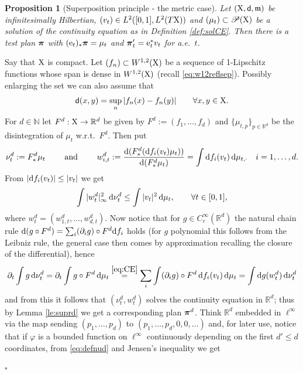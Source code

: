 \documentclass[11pt]{article}
\numberwithin{equation}{section}
\newtheorem{proposition}[theorem]{Proposition}
\newenvironment{idea}{\removelastskip\par\medskip   %
\noindent{\em Idea of the proof} \rm}{\penalty-20\null\hfill$\square$\par\medbreak}
\newcommand{\N}{\mathbb{N}}
\newcommand{\R}{\mathbb{R}}
\newcommand{\ppi}{{\mbox{\boldmath$\pi$}}}
\newcommand{\pr}{\mathscr P}
\newcommand{\e}{{\rm e}}
\newcommand{\X}{{\rm X}}
\newcommand{\sfd}{{\sf d}}
\newcommand{\mm}{{\mathfrak m}}
\renewcommand{\d}{{\rm d}}
\begin{document}
\begin{proposition}[Superposition principle  - the metric case]\label{prop:supmet}
Let $(\X,\sfd,\mm)$ be infinitesimally Hilbertian, $(v_t)\in L^2([0,1],L^2(T\X))$ and $(\mu_t)\subset  \pr(\X)$ be a solution of the continuity equation as in Definition \ref{def:solCE}. Then there is a test plan $\ppi$ with $(\e_t)_*\ppi=\mu_t$ and $\ppi'_t=\e_t^*v_t$ for a.e.\ $t$. 
\end{proposition}
\begin{idea} Say that $\X$ is compact. Let $(f_n)\subset W^{1,2}(\X)$ be a sequence of 1-Lipschitz  functions whose span is dense in $W^{1,2}(\X)$ (recall \eqref{eq:w12reflsep}). Possibly enlarging the set we can also assume that 
\begin{equation}
\label{eq:isoF}
\sfd(x,y)=\sup_n|f_n(x)-f_n(y)|\qquad\forall x,y\in\X.
\end{equation}
For $d\in\N$ let $F^d:\X\to\R^d$ be given by $F^d:=(f_1,\ldots,f_d)$ and $\{\mu_{t,p}\}_{p\in\R^d} $ be  the disintegration of $\mu_t$ w.r.t.\ $F^d$. Then put 
\begin{equation}
\label{eq:defnud}
\nu^d_t:=F^d_*\mu_t\qquad\text{ and }\qquad w^d_{i,t}:=\frac{\d(F^d_*(\d f_i(v_t)\mu_t))}{\d( F^d_*\mu_t)}= \int \d f_i(v_t)\,\d\mu_{t,\cdot}\quad i=1,\ldots,d.
\end{equation}
From $|\d f_i(v_t)|\leq |v_t|$ we get
\begin{equation}
\label{eq:pertigsup}
\int |w^d_{t}|_\infty^2\,\d\nu^d_t\leq \int|v_t|^2\,\d\mu_t,\qquad\forall t\in[0,1],
\end{equation}
where $w^d_t=(w^d_{1,t},\ldots,w^d_{d,t})$. Now notice  that for $g\in C^\infty_c(\R^d)$ the natural chain rule $\d(g\circ F^d)=\sum_i(\partial_i g)\circ F^d\d f_i$ holds (for $g$ polynomial this follows from  the Leibniz rule, the general case then comes by approximation recalling the closure of the differential), hence
\[
\begin{split}
\partial_t\int g\,\d\nu^d_t=\partial_t\int g\circ F^d\,\d\mu_t\stackrel{\eqref{eq:CE}}=\sum_i\int (\partial_i g)\circ F^d\,\d f_i(v_t)\,\d\mu_t=\int \d g(w^d_t)\,\d\nu^d_t
\end{split}
\]
and from this it follows that $(\nu^d_t,w^d_t)$ solves the continuity equation in $\R^d$; thus by Lemma \ref{le:suprd} we get a corresponding plan $\ppi^d$. Think $\R^d$ embedded in $\ell^\infty$ via the map sending $(p_1,\ldots,p_d)$ to $(p_1,\ldots,p_d,0,0,\ldots)$ and, for later use, notice that if $\varphi$ is a bounded function on $\ell^\infty$ continuously depending on the first $d'\leq d$  coordinates, from \eqref{eq:defnud} and Jensen's inequality we get

\end{idea}
\end{document}
